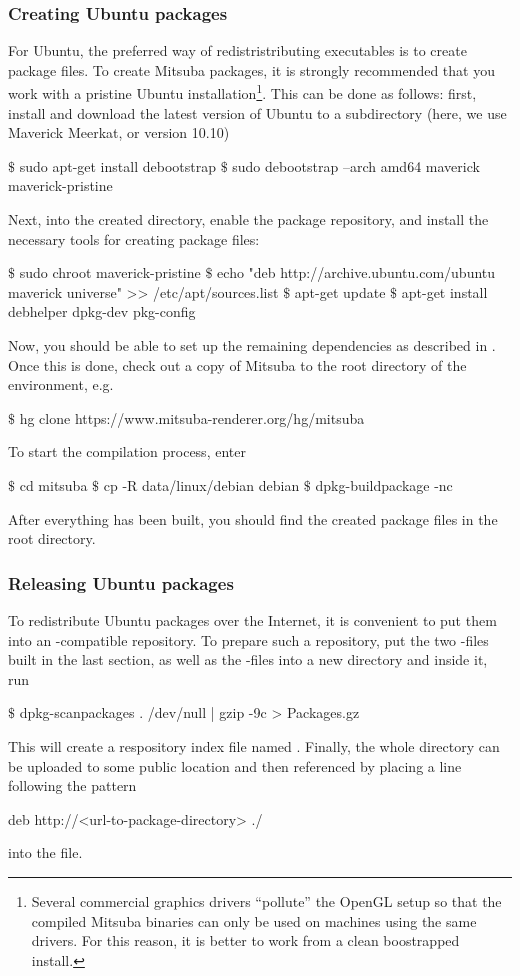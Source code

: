 \subsubsection{Creating Ubuntu packages}
For Ubuntu, the preferred way of redistristributing executables is to create
 package files. To create Mitsuba packages, it is strongly recommended
that you work with a pristine Ubuntu installation\footnote{Several commercial graphics 
drivers ``pollute'' the OpenGL setup so that the compiled Mitsuba binaries 
can only be used on machines using the same drivers. For this reason, it is 
better to work from a clean boostrapped install.}. This can be done as follows:
first, install  and download the latest version of Ubuntu
to a subdirectory (here, we use Maverick Meerkat, or version 10.10)
\begin{shell}
$\text{\$}$ sudo apt-get install debootstrap
$\text{\$}$ sudo debootstrap --arch amd64 maverick maverick-pristine
\end{shell}
Next,  into the created directory, enable the  package repository,
and install the necessary tools for creating package files:
\begin{shell}
$\text{\$}$ sudo chroot maverick-pristine
$\text{\$}$ echo "deb http://archive.ubuntu.com/ubuntu maverick universe" >> /etc/apt/sources.list
$\text{\$}$ apt-get update
$\text{\$}$ apt-get install debhelper dpkg-dev pkg-config
\end{shell}
Now, you should be able to set up the remaining dependencies as described in .
Once this is done, check out a copy of Mitsuba to the root directory of the  environment, e.g.
\begin{shell}
$\text{\$}$ hg clone https://www.mitsuba-renderer.org/hg/mitsuba
\end{shell}
To start the compilation process, enter
\begin{shell}
$\text{\$}$ cd mitsuba
$\text{\$}$ cp -R data/linux/debian debian
$\text{\$}$ dpkg-buildpackage -nc
\end{shell}
After everything has been built, you should find the created package files
in the root directory.
\subsubsection{Releasing Ubuntu packages}
To redistribute Ubuntu packages over the Internet, it is convenient to 
put them into an -compatible repository. To prepare such a
repository, put the two -files built in the last section, as well as the 
 -files into a new directory and inside
it, run
\begin{shell}
$\text{\$}$ dpkg-scanpackages . /dev/null | gzip -9c > Packages.gz
\end{shell}
This will create a respository index file named .
Finally, the whole directory can be uploaded to some public location
and then referenced by placing a line following the pattern
\begin{shell}
deb http://<url-to-package-directory> ./
\end{shell}
into the  file.

